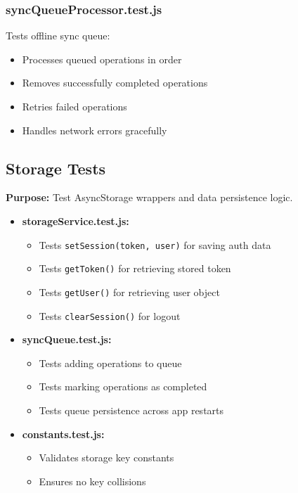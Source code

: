 \subsubsection{syncQueueProcessor.test.js}
\label{subsubsec:sync_queue_processor_test}

Tests offline sync queue:
\begin{itemize}
    \item Processes queued operations in order
    \item Removes successfully completed operations
    \item Retries failed operations
    \item Handles network errors gracefully
\end{itemize}

\subsection{Storage Tests}
\label{subsec:storage_tests}

\textbf{Purpose:} Test AsyncStorage wrappers and data persistence logic.

\begin{itemize}
    \item \textbf{storageService.test.js:}
    \begin{itemize}
        \item Tests \texttt{setSession(token, user)} for saving auth data
        \item Tests \texttt{getToken()} for retrieving stored token
        \item Tests \texttt{getUser()} for retrieving user object
        \item Tests \texttt{clearSession()} for logout
    \end{itemize}
    
    \item \textbf{syncQueue.test.js:}
    \begin{itemize}
        \item Tests adding operations to queue
        \item Tests marking operations as completed
        \item Tests queue persistence across app restarts
    \end{itemize}
    
    \item \textbf{constants.test.js:}
    \begin{itemize}
        \item Validates storage key constants
        \item Ensures no key collisions
    \end{itemize}
\end{itemize}



